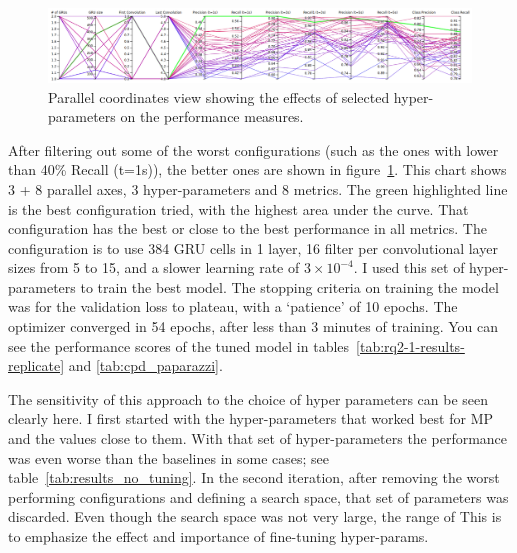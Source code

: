 \begin{figure}
    \centering
    \includegraphics[width=\columnwidth]{RQ3-5_charts/refined_prec_recall_white_background.png}
    \caption{Parallel coordinates view showing the effects of selected hyper-parameters on the performance measures.}
    \label{fig:precision_recall_parallel_coordinates}
\end{figure}
After filtering out some of the worst configurations (such as the ones with lower than 40\% Recall (t=1s)), the better ones are shown in figure~\ref{fig:precision_recall_parallel_coordinates}. 
This chart shows 3 + 8 parallel axes, 3 hyper-parameters and 8 metrics. 
The green highlighted line is the best configuration tried, with the highest area under the curve. That configuration has the best or close to the best performance in all metrics. 
The configuration is to use 384 GRU cells in 1 layer, 16 filter per convolutional layer sizes from 5 to 15, and a slower learning rate of $3\times10^{-4}$.
I used this set of hyper-parameters to train the best model. The stopping criteria on training the model was for the validation loss to plateau, with a `patience' of 10 epochs. The optimizer converged in 54 epochs, after less than 3 minutes of training.
You can see the performance scores of the tuned model in tables~\ref{tab:rq2-1-results-replicate} and \ref{tab:cpd_paparazzi}.

The sensitivity of this approach to the choice of hyper parameters can be seen clearly here. I first started with the hyper-parameters that worked best for MP and the values close to them. With that set of hyper-parameters the performance was even worse than the baselines in some cases; see table~\ref{tab:results_no_tuning}.
In the second iteration, after removing the worst performing configurations and defining a search space, that set of parameters was discarded. 
Even though the search space was not very large, the range of 
This is to emphasize the effect and importance of fine-tuning hyper-params.

